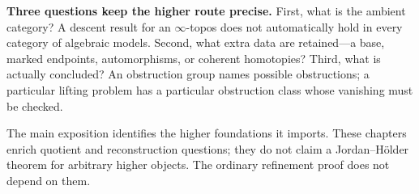 \textbf{Three questions keep the higher route precise.}
First, what is the ambient category? A descent result for an
\(\infty\)-topos does not automatically hold in every category of
algebraic models. Second, what extra data are retained---a base, marked
endpoints, automorphisms, or coherent homotopies? Third, what is actually
concluded? An obstruction group names possible obstructions; a particular
lifting problem has a particular obstruction class whose vanishing must
be checked.

The main exposition identifies the higher foundations it imports.
These chapters enrich quotient and reconstruction questions; they do
not claim a Jordan--Hölder theorem for arbitrary higher objects.
The ordinary refinement proof does not depend on them.

